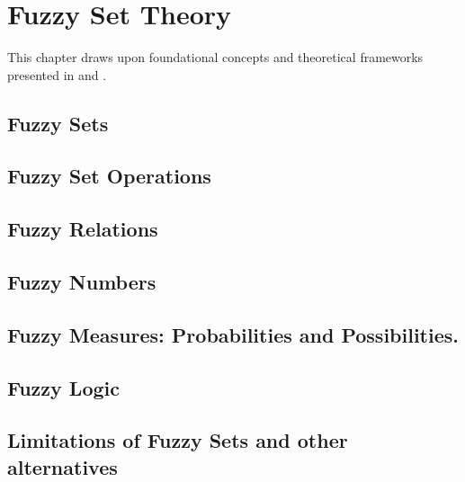 \chapter{Fuzzy Set Theory}
\label{ch:FStheory}
This chapter draws upon foundational concepts and theoretical frameworks presented in \cite{FULLER1} and \cite{FULLER2}. 

\section{Fuzzy Sets}

\section{Fuzzy Set Operations} \label{sec:set_operations}

\section{Fuzzy Relations}

\section{Fuzzy Numbers}\label{sec:fuzzy_numbers}

\section{Fuzzy Measures: Probabilities and Possibilities.}

\section{Fuzzy Logic}\label{sec:fuzzy_logic}


\section{Limitations of Fuzzy Sets and other alternatives}
